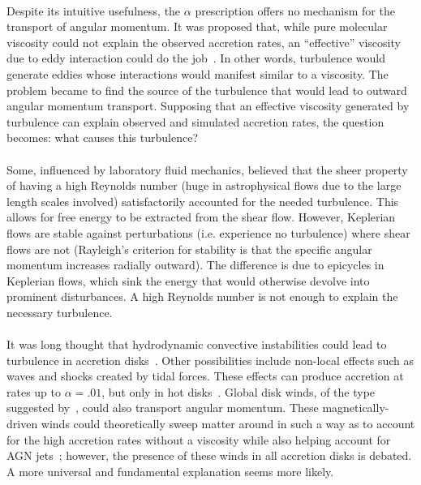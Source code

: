 \\
Despite its intuitive usefulness, the $\alpha$ prescription offers no mechanism for the transport of angular momentum. It was proposed that, while pure molecular viscosity could not explain the observed accretion rates, an ``effective'' viscosity due to eddy interaction could do the job~\cite{BH1998}. In other words, turbulence would generate eddies whose interactions would manifest similar to a viscosity. The problem became to find the source of the turbulence that would lead to outward angular momentum transport. Supposing that an effective viscosity generated by turbulence can explain observed and simulated accretion rates, the question becomes: what causes this turbulence? \\
\\
Some, influenced by laboratory fluid mechanics, believed that the sheer property of having a high Reynolds number (huge in astrophysical flows due to the large length scales involved) satisfactorily accounted for the needed turbulence. This allows for free energy to be extracted from the shear flow. However, Keplerian flows are stable against perturbations (i.e. experience no turbulence) where shear flows are not (Rayleigh's criterion for stability is that the specific angular momentum increases radially outward). The difference is due to epicycles in Keplerian flows, which sink the energy that would otherwise devolve into prominent disturbances. A high Reynolds number is not enough to explain the necessary turbulence.\\
\\
It was long thought that hydrodynamic convective instabilities could lead to turbulence in accretion disks~\cite{Paczynski1978,Stone1999}. Other possibilities include non-local effects such as waves and shocks created by tidal forces. These effects can produce accretion at rates up to $\alpha=.01$, but only in hot disks~\cite{Spruit2009}. Global disk winds, of the type suggested by~\citet{Blandford1977}, could also transport angular momentum. These magnetically-driven winds could theoretically sweep matter around in such a way as to account for the high accretion rates without a viscosity while also helping account for AGN jets~\cite{Koenigl1989}; however, the presence of these winds in all accretion disks is debated. A more universal and fundamental explanation seems more likely.\\
\\

